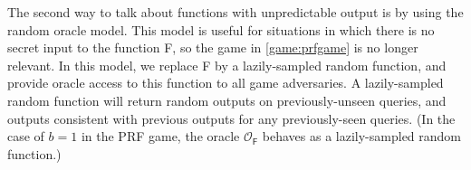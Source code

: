 The second way to talk about functions with unpredictable output is by using the random oracle model. This model is useful for situations in which there is no secret input to the function \textsf{F}, so the game in \autoref{game:prfgame} is no longer relevant. In this model, we replace \textsf{F} by a lazily-sampled random function, and provide oracle access to this function to all game adversaries. A lazily-sampled random function will return random outputs on previously-unseen queries, and outputs consistent with previous outputs for any previously-seen queries. (In the case of $b=1$ in the PRF game, the oracle $\mathcal{O}_\mathsf{F}$ behaves as a lazily-sampled random function.)
